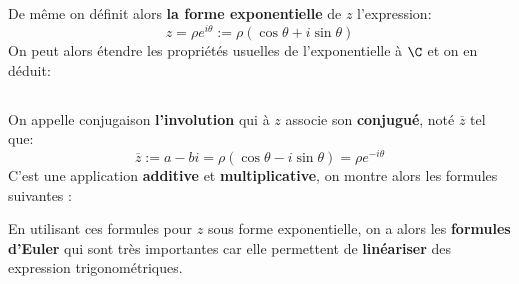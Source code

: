 \subsection*{}
De même on définit alors \textbf{la forme exponentielle} de \(z\) l'expression:
\[
    z = \rho e^{i\theta} := \rho(\cos\theta+i\sin\theta)
\]
On peut alors étendre les propriétés usuelles de l'exponentielle à \(\C\) et on en déduit:

\subsection*{}
On appelle conjugaison \textbf{l'involution} qui à \(z\) associe son \textbf{conjugué}, noté \(\overline{z}\) tel que:
\[
    \overline{z} := a - bi = \rho(\cos\theta - i\sin\theta) = \rho e^{-i\theta}
\]
C'est une application \textbf{additive} et \textbf{multiplicative}, on montre alors les formules suivantes {:}

En utilisant ces formules pour \(z\) sous forme exponentielle, on a alors les \textbf{formules d'Euler} qui sont très importantes car elle permettent de \textbf{linéariser} des expression trigonométriques.\<

